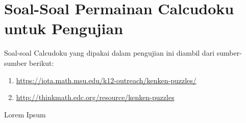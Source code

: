 \chapter{Soal-Soal Permainan Calcudoku untuk Pengujian}
\label{chap:soalsoal}

Soal-soal Calcudoku yang dipakai dalam pengujian ini diambil dari sumber-sumber berikut:

\begin{enumerate}
\item \url{https://iota.math.msu.edu/k12-outreach/kenken-puzzles/}
\item \url{http://thinkmath.edc.org/resource/kenken-puzzles}
\end{enumerate}

Lorem Ipsum